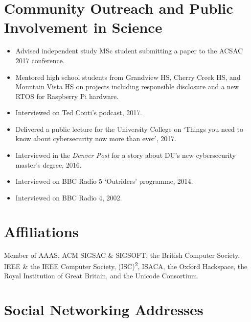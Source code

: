 \documentclass[12pt,twoside,letterpaper]{article}
\begin{document}
\vspace{-7mm}
\section*{Community Outreach and Public Involvement in Science}
\vspace{-2mm}

\begin{itemize}
    \item Advised independent study MSc student submitting a paper to the
        ACSAC 2017 conference.
    \item Mentored high school students from Grandview HS, Cherry Creek HS,
        and Mountain Vista HS on projects including responsible disclosure
        and a new RTOS for Raspberry Pi hardware.
    \item Interviewed on Ted Conti's podcast, 2017.
    \item Delivered a public lecture for the University College on `Things
        you need to know about cybersecurity now more than ever', 2017.
    \item Interviewed in the \emph{Denver Post} for a story about DU's new
        cybersecurity master's degree, 2016.
    \item Interviewed on BBC Radio 5 `Outriders' programme, 2014.
    \item Interviewed on BBC Radio 4, 2002.
\end{itemize}

\vspace{-7mm}
\section*{Affiliations}
\vspace{-2mm}

Member of AAAS, ACM SIGSAC \& SIGSOFT, the British Computer Society,
IEEE \& the IEEE Computer Society,
(ISC)\textsuperscript{2}, ISACA, the Oxford Hackspace, the Royal
Institution of Great Britain, and the Unicode Consortium.


\vspace{-3mm}
\section*{Social Networking Addresses}
\end{document}
